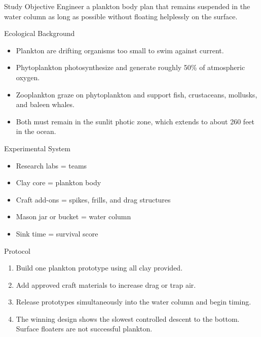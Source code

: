 \documentclass[10pt]{article}
\begin{document}
\begin{minipage}[t]{0.485\textwidth}
\vspace{0pt}
\begin{labbox}{Study Objective}
Engineer a plankton body plan that remains suspended in the water column as long as possible without floating helplessly on the surface.
\end{labbox}

\begin{labbox}{Ecological Background}
\begin{itemize}
\item Plankton are drifting organisms too small to swim against current.
\item Phytoplankton photosynthesize and generate roughly 50\% of atmospheric oxygen.
\item Zooplankton graze on phytoplankton and support fish, crustaceans, mollusks, and baleen whales.
\item Both must remain in the sunlit photic zone, which extends to about 260 feet in the ocean.
\end{itemize}
\end{labbox}

\begin{labbox}{Experimental System}
\begin{itemize}
\item Research labs = teams
\item Clay core = plankton body
\item Craft add-ons = spikes, frills, and drag structures
\item Mason jar or bucket = water column
\item Sink time = survival score
\end{itemize}
\end{labbox}

\begin{labbox}{Protocol}
\begin{enumerate}
\item Build one plankton prototype using all clay provided.
\item Add approved craft materials to increase drag or trap air.
\item Release prototypes simultaneously into the water column and begin timing.
\item The winning design shows the slowest controlled descent to the bottom. Surface floaters are not successful plankton.
\end{enumerate}
\end{labbox}
\end{minipage}\hfill
\end{document}
